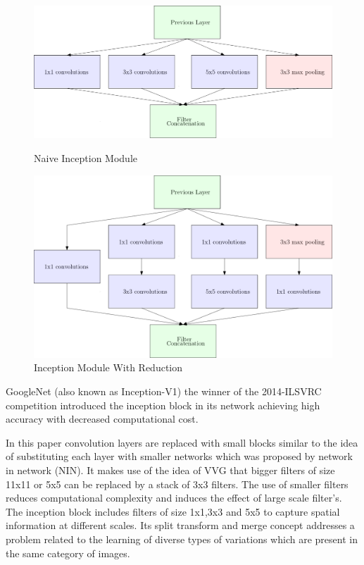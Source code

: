\documentclass[
a4paper, 
12pt,
grayscalebody, %
abstract=on,
twoside, BCOR10mm, 12pt, DIV13,headinclude, footexclude, final, abstracton, openright
]{ibireprt}
\numberwithin{equation}{chapter}
\numberwithin{table}{chapter}
\numberwithin{figure}{chapter}
\numberwithin{algorithm}{chapter}
\numberwithin{example}{chapter}
\numberwithin{example}{chapter}
\begin{document}
\begin{figure}[h]	
	\centering
	\begin{minipage}[t]{.49\linewidth}
		\centering
		\includegraphics[width = \textwidth]{Inception_modle_naive.png}%
		\caption{Naive Inception Module}
		\label{fig:fig_max_pooling}
		
	\end{minipage}
	\hfill
	\begin{minipage}[t]{.49\linewidth}
		\centering
		\includegraphics[width = \textwidth]{Inception_modle_reduction.png}%
		\caption{Inception Module With Reduction}
		\label{fig:fig_max_pooling}
		
	\end{minipage}
\end{figure}%


GoogleNet (also known as Inception-V1) the winner of the 2014-ILSVRC competition introduced the inception block in its network achieving high accuracy with decreased computational cost. \cite{Szegedy2015}

In this paper convolution layers are replaced with small blocks similar to the idea of substituting each layer with smaller networks which was proposed by network in network (NIN). It makes use of the idea of VVG that bigger filters of size 11x11 or 5x5 can be replaced by a stack of 3x3 filters. The use of smaller filters reduces computational complexity and induces the effect of large scale filter's. The inception block includes filters of size 1x1,3x3 and 5x5 to capture spatial information at different scales. Its split transform and merge concept addresses a problem related to the learning of diverse types of variations which are present in the same category of images.
\end{document}
